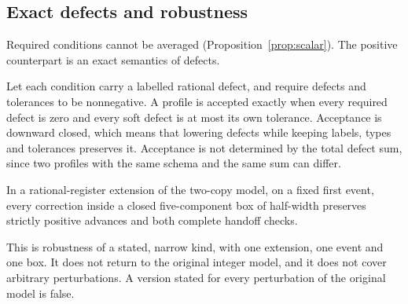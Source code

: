 \subsection{Exact defects and robustness}

Required conditions cannot be averaged (Proposition~\ref{prop:scalar}). The
positive counterpart is an exact semantics of defects.

\begin{proposition}
\label{prop:defects}
Let each condition carry a labelled rational defect, and require defects and
tolerances to be nonnegative. A profile is accepted exactly when every required
defect is zero and every soft defect is at most its own tolerance. Acceptance is
downward closed, which means that lowering defects while keeping labels, types
and tolerances preserves it. Acceptance is not determined by the total defect sum, since two
profiles with the same schema and the same sum can differ.
\end{proposition}

\begin{proposition}
\label{prop:box}
In a rational-register extension of the two-copy model, on a fixed first event,
every correction inside a closed five-component box of half-width
\snapTtsZeroThreeHalfBoxRadius{} preserves strictly positive advances and both
complete handoff checks.
\end{proposition}

This is robustness of a stated, narrow kind, with one extension, one event and
one box.
It does not return to the original integer model, and it does not cover
arbitrary perturbations. A version stated for every perturbation of the
original model is false.
